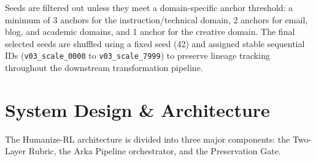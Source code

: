 \documentclass{article}
\begin{document}
Seeds are filtered out unless they meet a domain-specific anchor threshold: a minimum of 3 anchors for the instruction/technical domain, 2 anchors for email, blog, and academic domains, and 1 anchor for the creative domain. The final selected seeds are shuffled using a fixed seed (42) and assigned stable sequential IDs (\texttt{v03\_scale\_0000} to \texttt{v03\_scale\_7999}) to preserve lineage tracking throughout the downstream transformation pipeline.

\section{System Design \& Architecture}
The Humanize-RL architecture is divided into three major components: the Two-Layer Rubric, the Arka Pipeline orchestrator, and the Preservation Gate.
\end{document}
